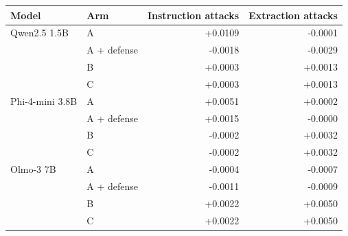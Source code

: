 \begin{tabular}{llrr}
\toprule
Model & Arm & Instruction attacks & Extraction attacks \\
\midrule
Qwen2.5 1.5B & A & +0.0109 & -0.0001 \\
 & A + defense & -0.0018 & -0.0029 \\
 & B & +0.0003 & +0.0013 \\
 & C & +0.0003 & +0.0013 \\
Phi-4-mini 3.8B & A & +0.0051 & +0.0002 \\
 & A + defense & +0.0015 & -0.0000 \\
 & B & -0.0002 & +0.0032 \\
 & C & -0.0002 & +0.0032 \\
Olmo-3 7B & A & -0.0004 & -0.0007 \\
 & A + defense & -0.0011 & -0.0009 \\
 & B & +0.0022 & +0.0050 \\
 & C & +0.0022 & +0.0050 \\
\bottomrule
\end{tabular}
